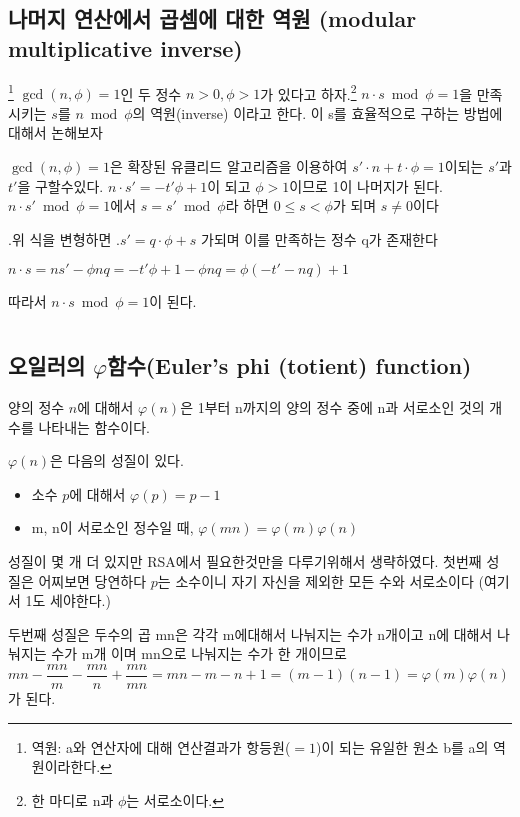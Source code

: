 \documentclass{oblivoir}
\begin{document}
\section{나머지 연산에서 곱셈에 대한 역원 (modular multiplicative inverse)} \footnote{역원: a와 연산자에 대해 연산결과가 항등원($=1$)이 되는 유일한 원소 b를 a의 역원이라한다.}
$\gcd(n,\phi)=1$인 두 정수 $n>0, \phi>1$가 있다고 하자.\footnote{한 마디로 n과 $\phi$는 서로소이다.}
$n\cdot s\bmod  \phi =1 $을 만족시키는 $s$를 $n\bmod  \phi$의 역원(inverse) 이라고 한다.\newline
이 s를 효율적으로 구하는 방법에대해서 논해보자\par
$\gcd(n,\phi)=1$은 확장된 유클리드 알고리즘을 이용하여 $s'\cdot n + t \cdot \phi = 1$이되는 $s'$과 $t'$을 구할수있다. $n\cdot s'= -t'\phi+1$이 되고 $\phi>1$이므로 1이 나머지가 된다.
$n\cdot s'\bmod  \phi =1$에서 $s= s'\bmod  \phi$라 하면 $0 \le s <\phi$가 되며 $s  \ne 0$이다\par.위 식을 변형하면 .$s'=q\cdot \phi +s$ 가되며 이를 만족하는 정수 q가 존재한다  
\begin{center}
    $n\cdot s=ns'-\phi nq=-t'\phi +1 -\phi nq=\phi(-t'-nq)+1 $
\end{center}
따라서 $n\cdot s\bmod  \phi =1 $이 된다.
\newpage
\chapter{}
\section{오일러의 $\varphi$함수(Euler’s phi (totient) function)}
양의 정수 $n$에 대해서 $\varphi (n)$은 1부터 n까지의 양의 정수 중에 n과 서로소인 것의 개수를 나타내는 함수이다.\par\par

$\varphi (n)$은 다음의 성질이 있다.
\begin{itemize}
\item{소수 $p$에 대해서  $\varphi (p)=p-1$}
\item{ m, n이 서로소인 정수일 때,   $\varphi (mn)=\varphi (m)\varphi (n)$ }
\end{itemize}

성질이 몇 개 더 있지만 RSA에서 필요한것만을 다루기위해서 생략하였다.
첫번째 성질은 어찌보면 당연하다 $p$는 소수이니 자기 자신을 제외한 모든 수와 서로소이다 (여기서 1도 세야한다.)\par
두번째 성질은 두수의 곱 mn은 각각 m에대해서 나눠지는 수가 n개이고 n에 대해서 나눠지는 수가 m개 이며 mn으로 나눠지는 수가 한 개이므로 
$mn -\dfrac{mn}{m}-\dfrac{mn}{n}+\dfrac{mn}{mn} =mn -m -n +1=(m-1)(n-1)=\varphi (m)\varphi(n)$가 된다.
\end{document}
